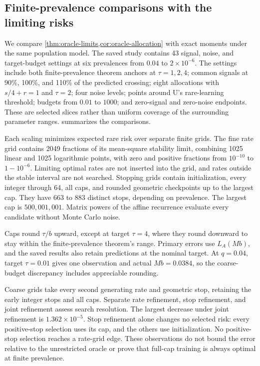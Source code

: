 \subsection{Finite-prevalence comparisons with the limiting risks}
\label{sec:oracle-finite}

We compare \cref{thm:oracle-limits,cor:oracle-allocation} with exact moments
under the same population model. The saved study contains 43 signal, noise, and
target-budget settings at six prevalences from $0.04$ to $2 \times 10^{-6}$. The
settings include both finite-prevalence theorem anchors at $\tau = 1,2,4$;
common signals at 90\%, 100\%, and 110\% of the predicted crossing; eight
allocations with $s/4 + r = 1$ and $\tau = 2$; four noise levels; points around
U's rare-learning threshold; budgets from $0.01$ to $1000$; and zero-signal and
zero-noise endpoints. These are selected slices rather than uniform coverage of
the surrounding parameter ranges.  summarizes the
comparisons.

Each scaling minimizes expected rare risk over separate finite grids. The fine
rate grid contains 2049 fractions of its mean-square stability limit, combining
1025 linear and 1025 logarithmic points, with zero and positive fractions from
$10^{-10}$ to $1 - 10^{-6}$. Limiting optimal rates are not inserted into the
grid, and rates outside the stable interval are not searched. Stopping grids
contain initialization, every integer through 64, all caps, and rounded
geometric checkpoints up to the largest cap. They have 663 to 883 distinct
stops, depending on prevalence. The largest cap is $500{,}001{,}001$. Matrix
powers of the affine recurrence evaluate every candidate without Monte Carlo
noise.

Caps round $\tau/b$ upward, except at target $\tau = 4$, where they round
downward to stay within the finite-prevalence theorem's range. Primary errors
use $L_A(Mb)$, and the saved results also retain predictions at the nominal
target. At $q = 0.04$, target $\tau = 0.01$ gives one observation and actual
$Mb = 0.0384$, so the coarse-budget discrepancy includes appreciable rounding.

Coarse grids take every second generating rate and geometric stop, retaining the
early integer stops and all caps. Separate rate refinement, stop refinement, and
joint refinement assess search resolution. The largest decrease under joint
refinement is $1.362 \times 10^{-5}$. Stop refinement alone changes no selected
risk: every positive-stop selection uses its cap, and the others use
initialization. No positive-stop selection reaches a rate-grid edge. These
observations do not bound the error relative to the unrestricted oracle or prove
that full-cap training is always optimal at finite prevalence.

